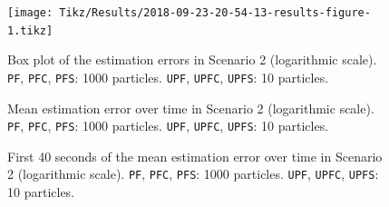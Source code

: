 


\begin{figure}
	\centering
	\setlength\figureheight{0.9\textheight} 	
	\setlength{}		
	\texttt{[image: Tikz/Results/2018-09-23-20-54-13-results-figure-1.tikz]}			
	\caption[Box plot of the estimation errors in Scenario 2. \texttt{PF}, \texttt{PFC}, \texttt{PFS}: 1000 particles. \texttt{UPF}, \texttt{UPFC}, \texttt{UPFS}: 10 particles.]{Box plot of the estimation errors in Scenario 2 (logarithmic scale). \texttt{PF}, \texttt{PFC}, \texttt{PFS}: 1000 particles. \texttt{UPF}, \texttt{UPFC}, \texttt{UPFS}: 10 particles.}
	\label{fig:2018-09-23-20-54-13-results-figure-1}			
\end{figure}

\begin{figure}
	\centering
	\setlength{} 	
	\setlength\figurewidth{0.9\textheight}		
	\caption[Mean estimation error over time in Scenario 2. \texttt{PF}, \texttt{PFC}, \texttt{PFS}: 1000 particles. \texttt{UPF}, \texttt{UPFC}, \texttt{UPFS}: 10 particles.]{Mean estimation error over time in Scenario 2 (logarithmic scale). \texttt{PF}, \texttt{PFC}, \texttt{PFS}: 1000 particles. \texttt{UPF}, \texttt{UPFC}, \texttt{UPFS}: 10 particles.}
	\label{fig:2018-09-23-20-54-13-results-figure-5}			
\end{figure}

\begin{figure}
	\centering
	\setlength{} 	
	\setlength\figurewidth{0.9\textheight}		
	\caption[First 40 seconds of the mean estimation error over time in Scenario 2. \texttt{PF}, \texttt{PFC}, \texttt{PFS}: 1000 particles. \texttt{UPF}, \texttt{UPFC}, \texttt{UPFS}: 10 particles.]{First 40 seconds of the mean estimation error over time in Scenario 2 (logarithmic scale). \texttt{PF}, \texttt{PFC}, \texttt{PFS}: 1000 particles. \texttt{UPF}, \texttt{UPFC}, \texttt{UPFS}: 10 particles.}
	\label{fig:2018-09-23-20-54-13-results-figure-7}			
\end{figure}



